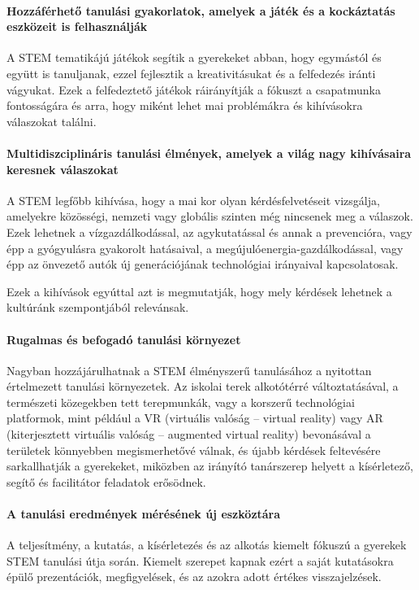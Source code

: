 \paragraph{Hozzáférhető tanulási gyakorlatok, amelyek a játék és a kockáztatás eszközeit is felhasználják} A STEM tematikájú játékok segítik a gyerekeket
abban, hogy egymástól és együtt is tanuljanak, ezzel fejlesztik a kreativitásukat és a felfedezés iránti vágyukat. Ezek a felfedeztető játékok ráirányítják a fókuszt a csapatmunka fontosságára és arra, hogy miként lehet mai problémákra és kihívásokra válaszokat találni.

\paragraph{Multidiszciplináris tanulási élmények, amelyek a világ nagy kihívásaira keresnek válaszokat} A STEM legfőbb kihívása, hogy a mai kor olyan
kérdésfelvetéseit vizsgálja, amelyekre közösségi, nemzeti vagy globális szinten még nincsenek meg a válaszok. Ezek lehetnek a vízgazdálkodással, az agykutatással és annak a prevencióra, vagy épp a gyógyulásra gyakorolt hatásaival, a megújulóenergia-gazdálkodással, vagy épp az önvezető autók új generációjának technológiai irányaival kapcsolatosak. 

Ezek a kihívások egyúttal azt is megmutatják, hogy mely kérdések lehetnek a kultúránk szempontjából relevánsak.

\paragraph{Rugalmas és befogadó tanulási környezet} Nagyban
hozzájárulhatnak a\linebreak
STEM élményszerű tanulásához a nyitottan értelmezett tanulási környezetek. Az iskolai terek alkotótérré változtatásával, a természeti közegekben tett terepmunkák, vagy a korszerű technológiai platformok, mint például a VR (virtuális valóság – virtual reality) vagy AR (kiterjesztett virtuális valóság – augmented virtual reality) bevonásával a területek könnyebben megismerhetővé válnak, és újabb kérdések feltevésére sarkallhatják a gyerekeket, miközben az irányító tanárszerep helyett a kísérletező, segítő és facilitátor feladatok erősödnek.

\paragraph{A tanulási eredmények mérésének új eszköztára} A teljesítmény, a
kutatás, a kísérletezés és az alkotás kiemelt fókuszú a gyerekek STEM tanulási útja során. Kiemelt szerepet kapnak ezért a saját kutatásokra épülő prezentációk, megfigyelések, és az azokra adott értékes visszajelzések.

